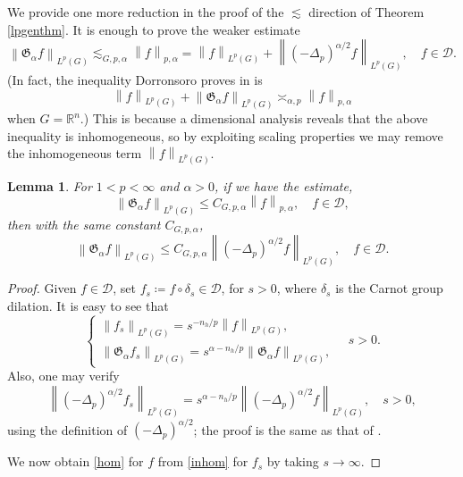 \documentclass[11pt,reqno]{amsart}
\newtheorem{lemma}[theorem]{Lemma}
\newcommand{\1}{\mathbf 1}
\begin{document}
We provide one more reduction in the proof of the $\lesssim$ direction of Theorem \ref{lpgenthm}. It is enough to prove the weaker estimate
\[
\left\|\mathfrak{G}_{\alpha}f\right\|_{L^p\left(G\right)} \lesssim_{G,p,\alpha} \left\|f\right\|_{p,\alpha} = \left\|f\right\|_{L^p\left(G\right)} + \left\|\left(-\Delta_p\right)^{\alpha/2}f\right\|_{L^p\left(G\right)},\quad f\in \mathcal{D}.
\]
(In fact, the inequality Dorronsoro proves in \cite[Theorem 2]{dorronsoro1985characterization} is
\[
\left\|f\right\|_{L^p\left(G\right)}+\left\|\mathfrak{G}_{\alpha}f\right\|_{L^p\left(G\right)} \asymp_{\alpha,p} \left\|f\right\|_{p,\alpha}
\]
when $G=\mathbb{R}^n$.) This is because a dimensional analysis reveals that the above inequality is inhomogeneous, so by exploiting scaling properties we may remove the inhomogeneous term $\left\|f\right\|_{L^p\left(G\right)}$.
\begin{lemma}
For $1<p<\infty$ and $\alpha>0$, if we have the estimate,
\begin{equation}\label{inhom} \left\|\mathfrak{G}_\alpha f\right\|_{L^p\left(G\right)} \le C_{G,p,\alpha} \left\|f\right\|_{p,\alpha},\quad f \in \mathcal{D},
\end{equation}
then with the same constant $C_{G,p,\alpha}$,
\begin{equation}\label{hom} \left\|\mathfrak{G}_\alpha f\right\|_{L^p\left(G\right)} \le C_{G,p,\alpha}\left\|\left(-\Delta_p\right)^{\alpha/2} f\right\|_{L^p\left(G\right)},\quad f\in \mathcal{D}.
\end{equation}
\end{lemma}

\begin{proof}
Given $f \in \mathcal{D}$, set $f_s\coloneqq f \circ \delta_s \in \mathcal{D}$, for $s>0$, where $\delta_s$ is the Carnot group dilation. It is easy to see that
\[
\begin{cases}
\left\|f_s\right\|_{L^p\left(G\right)} = s^{-n_h/p} \left\|f\right\|_{L^p\left(G\right)},\\
\left\|\mathfrak{G}_\alpha f_s\right\|_{L^p\left(G\right)} =  s^{\alpha-n_h/p}  \left\|\mathfrak{G}_\alpha f\right\|_{L^p\left(G\right)},
\end{cases}\quad s>0.
\]
Also, one may verify
\[
\left\|\left(-\Delta_p\right)^{\alpha/2} f_s\right\|_{L^p\left(G\right)} = s^{\alpha-n_h/p}  \left\|\left(-\Delta_p\right)^{\alpha/2} f\right\|_{L^p\left(G\right)},\quad s>0,
\]
using the definition of $\left(-\Delta_p\right)^{\alpha/2}$; the proof is the same as that of \cite[Lemma 2.6]{fassler2020dorronsoro}.

We now obtain \eqref{hom} for $f$ from \eqref{inhom} for $f_s$ by taking $s\to\infty$.
\end{proof}
\end{document}

